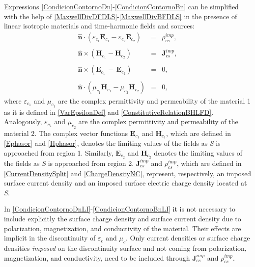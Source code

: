 Expressions \eqref{CondicionContornoDn}-\eqref{CondicionContornoBn} can be simplified with the help of \eqref{MaxwellDivDFDLS}-\eqref{MaxwellDivBFDLS} in the presence of linear isotropic materials and time-harmonic fields and sources: 
\begin{eqnarray}
    \mathbf{\hat{n}}\cdot\left(\varepsilon_{c_{1}}\mathbf{E}_{c_{1}} - \varepsilon_{c_{2}}\mathbf{E}_{c_{2}}\right) &=& \rho_{cs}^{imp}, \label{CondicionContornoDnLI}
	\\\nonumber
	\\[-1em]
    \mathbf{\hat{n}}\times\left(\mathbf{H}_{c_{1}} - \mathbf{H}_{c_{2}}\right) &=& \mathbf{J}_{cs}^{imp}, \label{CondicionContornoHtLI}
	\\\nonumber
	\\[-1em]
	\mathbf{\hat{n}}\times\left(\mathbf{E}_{c_{1}}\,-\,\mathbf{E}_{c_{2}}\right) &=& 0, \label{CondicionContornoEtLI}
	\\\nonumber
	\\[-1em]
	\mathbf{\hat{n}}\cdot\left(\mu_{c_{1}}\mathbf{H}_{c_{1}} - \mu_{c_{2}}\mathbf{H}_{c_{2}}\right) &=& 0, \label{CondicionContornoBnLI}
\end{eqnarray}
where $\varepsilon_{c_{1}}$ and $\mu_{c_{1}}$ are the complex permittivity and permeability of the material 1 as it is defined in \eqref{VarEpsilonDef} and \eqref{ConstitutiveRelationBHLFD}. Analogously, $\varepsilon_{c_{2}}$ and $\mu_{c_{2}}$ are the complex permittivity and permeability of the material 2. The complex vector functions $\mathbf{E}_{c_{1}}$ and $\mathbf{H}_{c_{1}}$, which are defined in \eqref{Ephasor} and \eqref{Hphasor}, denotes the limiting values of the fields as \emph{S} is approached from region 1. Similarly, $\mathbf{E}_{c_{2}}$ and $\mathbf{H}_{c_{2}}$ denotes the limiting values of the fields as \emph{S} is approached from region 2. $\mathbf{J}_{cs}^{imp}$ and $\rho_{cs}^{imp}$, which are defined in \eqref{CurrentDensitySplit} and \eqref{ChargeDensityNC}, represent, respectively, an imposed surface current density and an imposed surface electric charge density located at \emph{S}. 

In \eqref{CondicionContornoDnLI}-\eqref{CondicionContornoBnLI} it is not necessary to include explicitly the surface charge density and surface current density due to polarization, magnetization, and conductivity of the material. Their effects are implicit in the discontinuity of $\varepsilon_{c}$ and $\mu_{c}$. Only current densities or surface charge densities \textit{imposed} on the discontinuity surface and not coming from polarization, magnetization, and conductivity, need to be included through $\mathbf{J}_{cs}^{imp}$ and $\rho_{cs}^{imp}$.


